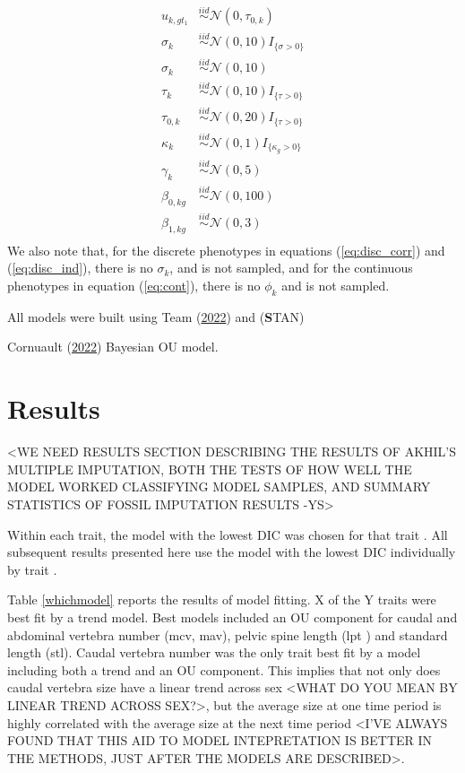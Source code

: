 \documentclass[
  12pt,
]{article}
\begin{document}
\begin{align}
u_{k,gt_1} & \overset{iid}{\sim}\mathcal{N}(0,\tau_{0,k}) \nonumber \\
\sigma_k & \overset{iid}{\sim}\mathcal{N}(0,10)I_{\{\sigma > 0\}} \nonumber \\
\sigma_k & \overset{iid}{\sim}\mathcal{N}(0,10) \nonumber \\
\tau_k & \overset{iid}{\sim}\mathcal{N}(0,10)I_{\{\tau > 0\}} \nonumber \\
\tau_{0,k} & \overset{iid}{\sim}\mathcal{N}(0,20)I_{\{\tau > 0\}} \nonumber \\
\kappa_k & \overset{iid}{\sim}\mathcal{N}(0,1)I_{\{\kappa_g > 0\}} \nonumber \\
\gamma_{k} & \overset{iid}{\sim}\mathcal{N}(0,5) \nonumber \\
\beta_{0,kg} & \overset{iid}{\sim}\mathcal{N}(0,100) \nonumber \\
\beta_{1,kg} & \overset{iid}{\sim}\mathcal{N}(0,3) \nonumber \\
\label{eq:priors}
\end{align} We also note that, for the discrete phenotypes in equations
(\ref{eq:disc_corr}) and (\ref{eq:disc_ind}), there is no \(\sigma_k\),
and is not sampled, and for the continuous phenotypes in equation
(\ref{eq:cont}), there is no \(\phi_k\) and is not sampled.

All models were built using Team
(\protect\hyperlink{ref-R2022language}{2022}) and (\textbf STAN)

Cornuault (\protect\hyperlink{ref-Cornault2022}{2022}) Bayesian OU
model.

\hypertarget{sec:results}{%
\section{Results}\label{sec:results}}

\textless WE NEED RESULTS SECTION DESCRIBING THE RESULTS OF AKHIL'S
MULTIPLE IMPUTATION, BOTH THE TESTS OF HOW WELL THE MODEL WORKED
CLASSIFYING MODEL SAMPLES, AND SUMMARY STATISTICS OF FOSSIL IMPUTATION
RESULTS -YS\textgreater{}

Within each trait, the model with the lowest DIC was chosen for that
trait . All subsequent results presented here use the model with the
lowest DIC individually by trait .

Table \ref{whichmodel} reports the results of model fitting. X of the Y
traits were best fit by a trend model. Best models included an OU
component for caudal and abdominal vertebra number (mcv, mav), pelvic
spine length (lpt ) and standard length (stl). Caudal vertebra number
was the only trait best fit by a model including both a trend and an OU
component. This implies that not only does caudal vertebra size have a
linear trend across sex \textless WHAT DO YOU MEAN BY LINEAR TREND
ACROSS SEX?\textgreater, but the average size at one time period is
highly correlated with the average size at the next time period
\textless I'VE ALWAYS FOUND THAT THIS AID TO MODEL INTEPRETATION IS
BETTER IN THE METHODS, JUST AFTER THE MODELS ARE DESCRIBED\textgreater.
\end{document}
